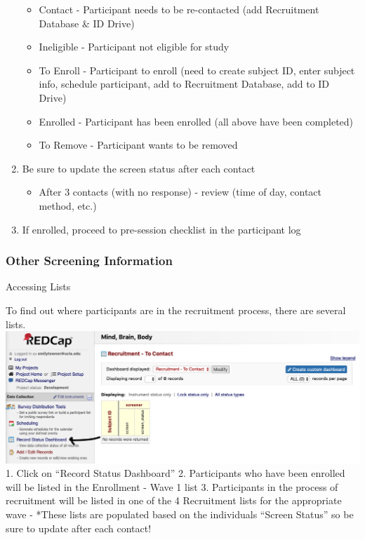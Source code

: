 \documentclass[]{book}
\providecommand{\tightlist}{%
  \setlength{\itemsep}{0pt}\setlength{\parskip}{0pt}}
\begin{document}
\begin{enumerate}
  \begin{itemize}
  \tightlist
  \item
    Contact - Participant needs to be re-contacted (add Recruitment Database \& ID Drive)
  \item
    Ineligible - Participant not eligible for study
  \item
    To Enroll - Participant to enroll (need to create subject ID, enter subject info, schedule participant, add to Recruitment Database, add to ID Drive)
  \item
    Enrolled - Participant has been enrolled (all above have been completed)
  \item
    To Remove - Participant wants to be removed
  \end{itemize}
\item
  Be sure to update the screen status after each contact

  \begin{itemize}
  \tightlist
  \item
    After 3 contacts (with no response) - review (time of day, contact method, etc.)
  \end{itemize}
\item
  If enrolled, proceed to pre-session checklist in the participant log
\end{enumerate}

\hypertarget{other-screening-information}{%
\subsubsection{Other Screening Information}\label{other-screening-information}}

Accessing Lists

To find out where participants are in the recruitment process, there are several lists.
\includegraphics{images/redcap_screening/7.png}
1. Click on ``Record Status Dashboard''
2. Participants who have been enrolled will be listed in the Enrollment - Wave 1 list
3. Participants in the process of recruitment will be listed in one of the 4 Recruitment lists for the appropriate wave
- *These lists are populated based on the individuals ``Screen Status'' so be sure to update after each contact!
\end{document}
